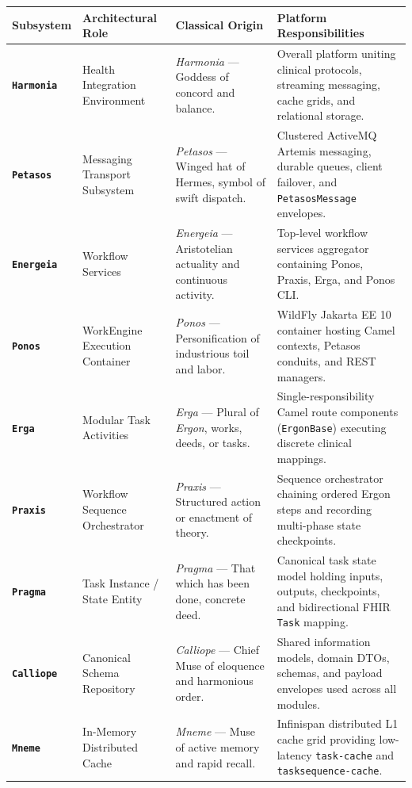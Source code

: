 \begin{table}[htbp]
\centering
\small
\begin{tabularx}{\textwidth}{l p{3.2cm} p{3.5cm} X}
\toprule
\textbf{Subsystem} & \textbf{Architectural Role} & \textbf{Classical Origin} & \textbf{Platform Responsibilities} \\
\midrule
\textbf{\texttt{Harmonia}} & Health Integration Environment & \textit{Harmonia} --- Goddess of concord and balance. & Overall platform uniting clinical protocols, streaming messaging, cache grids, and relational storage. \\
\addlinespace
\textbf{\texttt{Petasos}} & Messaging Transport Subsystem & \textit{Petasos} --- Winged hat of Hermes, symbol of swift dispatch. & Clustered ActiveMQ Artemis messaging, durable queues, client failover, and \texttt{PetasosMessage} envelopes. \\
\addlinespace
\textbf{\texttt{Energeia}} & Workflow Services & \textit{Energeia} --- Aristotelian actuality and continuous activity. & Top-level workflow services aggregator containing Ponos, Praxis, Erga, and Ponos CLI. \\
\addlinespace
\textbf{\texttt{Ponos}} & WorkEngine Execution Container & \textit{Ponos} --- Personification of industrious toil and labor. & WildFly Jakarta EE 10 container hosting Camel contexts, Petasos conduits, and REST managers. \\
\addlinespace
\textbf{\texttt{Erga}} & Modular Task Activities & \textit{Erga} --- Plural of \textit{Ergon}, works, deeds, or tasks. & Single-responsibility Camel route components (\texttt{ErgonBase}) executing discrete clinical mappings. \\
\addlinespace
\textbf{\texttt{Praxis}} & Workflow Sequence Orchestrator & \textit{Praxis} --- Structured action or enactment of theory. & Sequence orchestrator chaining ordered Ergon steps and recording multi-phase state checkpoints. \\
\addlinespace
\textbf{\texttt{Pragma}} & Task Instance / State Entity & \textit{Pragma} --- That which has been done, concrete deed. & Canonical task state model holding inputs, outputs, checkpoints, and bidirectional FHIR \texttt{Task} mapping. \\
\addlinespace
\textbf{\texttt{Calliope}} & Canonical Schema Repository & \textit{Calliope} --- Chief Muse of eloquence and harmonious order. & Shared information models, domain DTOs, schemas, and payload envelopes used across all modules. \\
\addlinespace
\textbf{\texttt{Mneme}} & In-Memory Distributed Cache & \textit{Mneme} --- Muse of active memory and rapid recall. & Infinispan distributed L1 cache grid providing low-latency \texttt{task-cache} and \texttt{tasksequence-cache}. \\

\end{tabularx}
\end{table}
